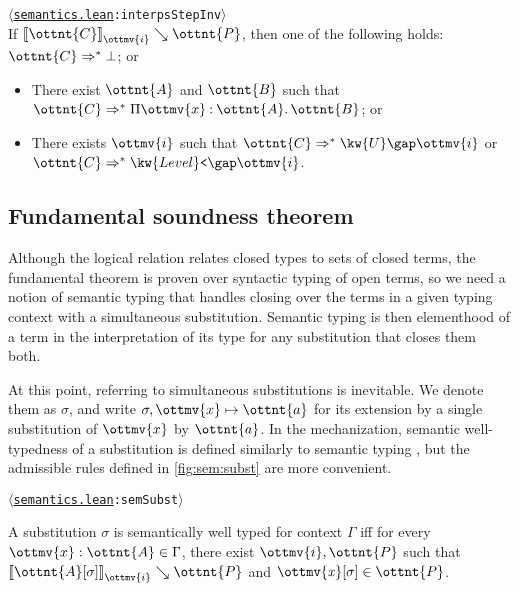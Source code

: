 \documentclass[a4paper,UKenglish,cleveref,autoref,thm-restate]{lipics-v2021}
\newcommand{\repo}{https://github.com/ionathanch/TTBFL}
\newcommand{\thmref}[2]{%
  $\langle$\href{\repo/tree/main/src/#1}{\texttt{#1}}\texttt{:#2}$\rangle$%
}
\begin{document}
\begin{lemma}[Inversion (l.r.)] \thmref{semantics.lean}{interpsStepInv} \label{lem:lr:inv} \\
  If $ \mathopen{\llbracket}  \ottnt{C}  \mathclose{\rrbracket}_{ \ottmv{i} } \searrow  \ottnt{P} $, then one of the following holds: $ \ottnt{C}  \Rightarrow^\ast   \bot  $; or
  \begin{itemize}[topsep=0pt]
    \item There exist $\ottnt{A}$ and $\ottnt{B}$ such that $ \ottnt{C}  \Rightarrow^\ast   \Pi  \ottmv{x}  \mathbin{:}  \ottnt{A}  \mathpunct{.}  \ottnt{B}  $; or
    \item There exists $\ottmv{i}$ such that $ \ottnt{C}  \Rightarrow^\ast   \kw{U} \gap   \ottmv{i}   $ or $ \ottnt{C}  \Rightarrow^\ast   \kw{Level}\texttt{<} \gap   \ottmv{i}   $.
  \end{itemize}
\end{lemma}

\subsection{Fundamental soundness theorem}

Although the logical relation relates closed types to sets of closed terms,
the fundamental theorem is proven over syntactic typing of open terms,
so we need a notion of semantic typing that handles closing over the terms
in a given typing context with a simultaneous substitution.
Semantic typing is then elementhood of a term in the interpretation of its type
for any substitution that closes them both.

At this point, referring to simultaneous substitutions is inevitable.
We denote them as $\sigma$, and write $ \sigma ,  \ottmv{x}  \mapsto  \ottnt{a} $
for its extension by a single substitution of $\ottmv{x}$ by $\ottnt{a}$.
In the mechanization, semantic well-typedness of a substitution \fbox{$ \sigma  \vDash  \Gamma $}
is defined similarly to semantic typing ,
but the admissible rules defined in \cref{fig:sem:subst} are more convenient.

\begin{definition} \thmref{semantics.lean}{semSubst}
  A substitution $\sigma$ is semantically well typed
  for context $\Gamma$ iff for every $ \ottmv{x}  \mathrel{:}  \ottnt{A}  \in  \Gamma $,
  there exist $\ottmv{i}, \ottnt{P}$ such that
  $ \mathopen{\llbracket}   \ottnt{A} [  \sigma  ]   \mathclose{\rrbracket}_{ \ottmv{i} } \searrow  \ottnt{P} $ and $   \mathit{ \ottmv{x} }  [  \sigma  ]   \in  \ottnt{P} $.
\end{definition}
\end{document}
